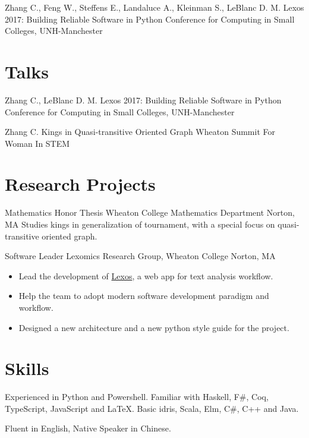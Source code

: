 \documentclass[11pt,a4paper,roman]{moderncv}        %
\begin{document}
{Zhang C., Feng W., Steffens E., Landaluce A., Kleinman S., LeBlanc D. M.}
{Lexos 2017: Building Reliable Software in Python}
{Conference for Computing in Small Colleges, UNH-Manchester}
{}{}


\section{Talks}

{Zhang C., LeBlanc D. M.}
{Lexos 2017: Building Reliable Software in Python}
{Conference for Computing in Small Colleges, UNH-Manchester}
{}{}

{Zhang C.}
{Kings in Quasi-transitive Oriented Graph}
{Wheaton Summit For Woman In STEM}
{}{}



\section{Research Projects}

{Mathematics Honor Thesis}
{Wheaton College Mathematics Department}
{Norton, MA}{}
{Studies kings in generalization of tournament,
with a special focus on quasi-transitive oriented graph.}

{Software Leader}
{Lexomics Research Group, Wheaton College}
{Norton, MA}{}
{
  \begin{itemize}
    \item
      Lead the development of \href{https://github.com/WheatonCS/Lexos}{Lexos}, a web app for text analysis workflow.
    \item
      Help the team to adopt modern software development paradigm and workflow.
    \item
      Designed a new architecture and a new python style guide for the project.
  \end{itemize}
}



\section{Skills}

{Experienced in Python and Powershell.
Familiar with Haskell, F\#, Coq, TypeScript, JavaScript and \LaTeX{}.
Basic idris, Scala, Elm, C\#, C++ and Java.}

{Fluent in English, Native Speaker in Chinese.}
\end{document}
